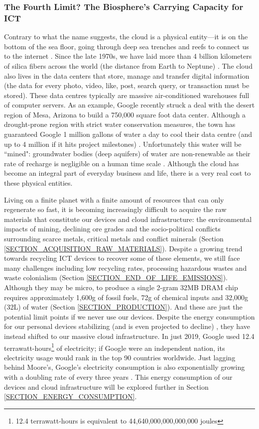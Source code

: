 \documentclass{article}
\begin{document}
\subsubsection{The Fourth Limit? The Biosphere's Carrying Capacity for ICT}
Contrary to what the name suggests, the cloud is a physical entity---it is on the bottom of the sea floor, going through deep sea trenches and reefs to connect us to the internet \cite{starosielski2012warning, blum2012tubes}. Since the late 1970s,  we have laid more than 4 billion kilometers of silica fibers across the world (the distance from Earth to Neptune) \cite{doi:10.1021/cen-09810-cover}. The cloud also lives in the data centers that store, manage and transfer digital information (the data for every photo, video, like, post, search query, or transaction must be stored). These data centres typically are massive air-conditioned warehouses full of computer servers. As an example, Google recently struck a deal with the desert region of Mesa, Arizona to build a 750,000 square foot data center. Although a drought-prone region with strict water conservation measures, the town has guaranteed Google 1 million gallons of water a day to cool their data centre (and up to 4 million if it hits project milestones) \cite{time2020googledatacenterwater}. Unfortunately this water will be ``mined": groundwater bodies (deep aquifers) of water are non-renewable as their rate of recharge is negligible on a human time scale \cite{un2003fao}. Although the cloud has become an integral part of everyday business and life, there is a very real cost to these physical entities. 

Living on a finite planet with a finite amount of resources that can only regenerate so fast, it is becoming increasingly difficult to acquire the raw materials that constitute our devices and cloud infrastructure: the environmental impacts of mining, declining ore grades and the socio-political conflicts surrounding scarce metals, critical metals and conflict minerals (Section \ref{SECTION_ACQUISITION_RAW_MATERIALS}). Despite a growing trend towards recycling ICT devices to recover some of these elements, we still face many challenges including low recycling rates, processing hazardous wastes and waste colonialism (Section \ref{SECTION_END_OF_LIFE_EMISSIONS}).
Although they may be micro, to produce a single 2-gram 32MB DRAM chip requires approximately 1,600g of fossil fuels, 72g of chemical inputs and 32,000g (32L) of water (Section \ref{SECTION_PRODUCTION}). And these are just the potential limit points if we never use our devices. Despite the energy consumption for our personal devices stabilizing (and is even projected to decline) \cite{andrae2015global}, they have instead shifted to our massive cloud infrastructure. In just 2019, Google used 12.4 terrawatt-hours\footnote{12.4 terrawatt-hours is equivalent to 44,640,000,000,000,000 joules} of electricity; if Google were an independent nation, its electricity usage would rank in the top 90 countries worldwide. Just lagging behind Moore's, Google's electricity consumption is also exponentially growing with a doubling rate of every three years \cite{forbes2020googleenergy}. This energy consumption of our devices and cloud infrastructure will be explored further in Section \ref{SECTION_ENERGY_CONSUMPTION}.
\end{document}

